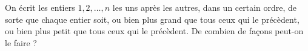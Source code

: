 On écrit les entiers $1, 2, \ldots, n$ les uns après les autres, dans un certain ordre, de sorte que chaque entier soit, ou bien plus grand que tous ceux qui le précèdent, ou bien plus petit que tous ceux qui le précèdent. De combien de façons peut-on le faire ?

